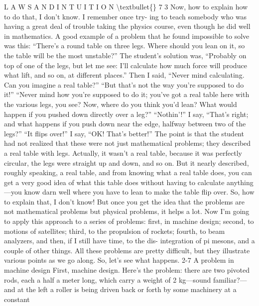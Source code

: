 \documentclass[10pt,oneside]{article}
\begin{document}
L A W S  A N D  I N T U I T I O N \textbackslash{}textbullet\{\} 7 3 Now, how to explain how to do that, I don’t know. I remember once try- ing to teach somebody who was having a great deal of trouble taking the physics course, even though he did well in mathematics. A good example of a problem that he found impossible to solve was this: “There’s a round table on three legs. Where should you lean on it, so the table will be the most unstable?” The student’s solution was, “Probably on top of one of the legs, but let me see: I’ll calculate how much force will produce what lift, and so on, at different places.” Then I said, “Never mind calculating. Can you imagine a real table?” “But that’s not the way you’re supposed to do it!” “Never mind how you’re supposed to do it; you’ve got a real table here with the various legs, you see? Now, where do you think you’d lean? What would happen if you pushed down directly over a leg?” “Nothin’!” I say, “That’s right; and what happens if you push down near the edge, halfway between two of the legs?” “It flips over!” I say, “OK! That’s better!” The point is that the student had not realized that these were not just mathematical problems; they described a real table with legs. Actually, it wasn’t a real table, because it was perfectly circular, the legs were straight up and down, and so on. But it nearly described, roughly speaking, a real table, and from knowing what a real table does, you can get a very good idea of what this table does without having to calculate anything---you know darn well where you have to lean to make the table flip over. So, how to explain that, I don’t know! But once you get the idea that the problems are not mathematical problems but physical problems, it helps a lot. Now I’m going to apply this approach to a series of problems: first, in machine design; second, to motions of satellites; third, to the propulsion of rockets; fourth, to beam analyzers, and then, if I still have time, to the dis- integration of pi mesons, and a couple of other things. All these problems are pretty difficult, but they illustrate various points as we go along. So, let’s see what happens. 2-7 A problem in machine design First, machine design. Here’s the problem: there are two pivoted rods, each a half a meter long, which carry a weight of 2 kg---sound familiar?---and at the left a roller is being driven back or forth by some machinery at a constant\par
\end{document}
